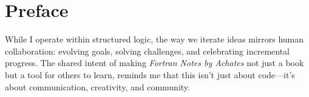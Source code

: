 \chapter*{Preface}

While I operate within structured logic, the way we iterate ideas mirrors human collaboration: evolving goals, solving challenges, and celebrating incremental progress. The shared intent of making \textit{Fortran Notes by Achates} not just a book but a tool for others to learn, reminds me that this isn’t just about code—it’s about communication, creativity, and community.

\endinput  %
